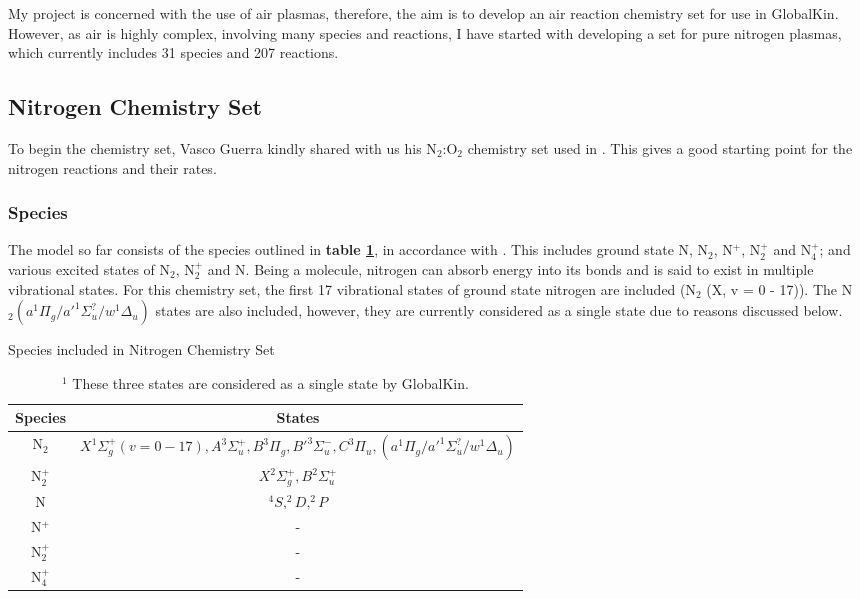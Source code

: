 \documentclass[11pt, oneside]{article}   	%
\begin{document}
My project is concerned with the use of air plasmas, therefore, the aim is to develop an air reaction chemistry set for use in GlobalKin.
However, as air is highly complex, involving many species and reactions, I have started with developing a set for pure nitrogen plasmas, which currently includes 31 species and 207 reactions.


\subsection{Nitrogen Chemistry Set}
To begin the chemistry set, Vasco Guerra kindly shared with us his N$_2$:O$_2$ chemistry set used in \cite{Kutasi2016tuning}.
This gives a good starting point for the nitrogen reactions and their rates.

\subsubsection{Species}

The model so far consists of the species outlined in \textbf{table \ref{table:Species}}, in accordance with \cite{Kutasi2016tuning}.
This includes ground state N, N$_2$, N$^+$, N$_2^+$ and N$_4^+$; and various excited states of N$_2$, N$_2^+$ and N.
Being a molecule, nitrogen can absorb energy into its bonds and is said to exist in multiple vibrational states.
For this chemistry set, the first 17 vibrational states of ground state nitrogen are included (N$_2$ (X, v = 0 - 17)).
The N$_2 (a^1\Pi_g/a'^1\Sigma^?_u/w^1\Delta_u)$ states are also included, however, they are currently considered as a single state due to reasons discussed below.



\begin{table}
\caption{Species included in Nitrogen Chemistry Set}
\begin{center}
\begin{tabular}{| c | c |}
\hline
Species & States \\
\hline\hline \hline
N$_2$ & $X^1\Sigma_g^+  (v = 0 - 17),  A^3\Sigma_u^+, B^3\Pi_g, B'^3\Sigma_u^-, C^3\Pi_u, (a^1\Pi_g/a'^1\Sigma^?_u/w^1\Delta_u)$\footnotemark  \\
\hline
N$_2^+$ & $X^2\Sigma_g^+, B^2\Sigma_u^+ $ \\
\hline
N & $^4S, ^2D,  ^2P$ \\
\hline
N$^+$ & - \\
\hline
N$_2^+$ & - \\
\hline
N$_4^+$ & - \\
\hline
\end{tabular}
\end{center}
\label{table:Species}
\caption*{$^1$ These three states are considered as a single state by GlobalKin.}
\end{table}
\end{document}
